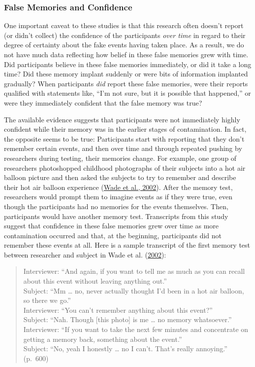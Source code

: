\documentclass[
]{krantz}
\begin{document}
\hypertarget{false-memories-and-confidence}{%
\subsubsection*{False Memories and Confidence}\label{false-memories-and-confidence}}


One important caveat to these studies is that this research often doesn't report (or didn't collect) the confidence of the participants \emph{over time} in regard to their degree of certainty about the fake events having taken place. As a result, we do not have much data reflecting how belief in these false memories grew with time. Did participants believe in these false memories immediately, or did it take a long time? Did these memory implant suddenly or were bits of information implanted gradually? When participants \emph{did} report these false memories, were their reports qualified with statements like, ``I'm not sure, but it is possible that happened,'' or were they immediately confident that the false memory was true?

The available evidence suggests that participants were not immediately highly confident while their memory was in the earlier stages of contamination. In fact, the opposite seems to be true: Participants start with reporting that they don't remember certain events, and then over time and through repeated pushing by researchers during testing, their memories change. For example, one group of researchers photoshopped childhood photographs of their subjects into a hot air balloon picture and then asked the subjects to try to remember and describe their hot air balloon experience (\protect\hyperlink{ref-wade2002picture}{Wade et al., 2002}). After the memory test, researchers would prompt them to imagine events as if they were true, even though the participants had no memories for the events themselves. Then, participants would have another memory test. Transcripts from this study suggest that confidence in these false memories grew over time as more contamination occurred and that, at the beginning, participants did not remember these events at all. Here is a sample transcript of the first memory test between researcher and subject in Wade et al. (\protect\hyperlink{ref-wade2002picture}{2002}):

\begin{quote}
Interviewer: ``And again, if you want to tell me as much as you can recall about this event without leaving anything out.''\\
Subject: ``Mm \ldots{} no, never actually thought I'd been in a hot air balloon, so there we go.''\\
Interviewer: ``You can't remember anything about this event?''\\
Subject: ``Nah. Though {[}this photo{]} is me \ldots{} no memory whatsoever.''\\
Interviewer: ``If you want to take the next few minutes and concentrate on getting a memory back, something about the event.''\\
Subject: ``No, yeah I honestly \ldots{} no I can't. That's really annoying.'' (p.~600)
\end{quote}
\end{document}

